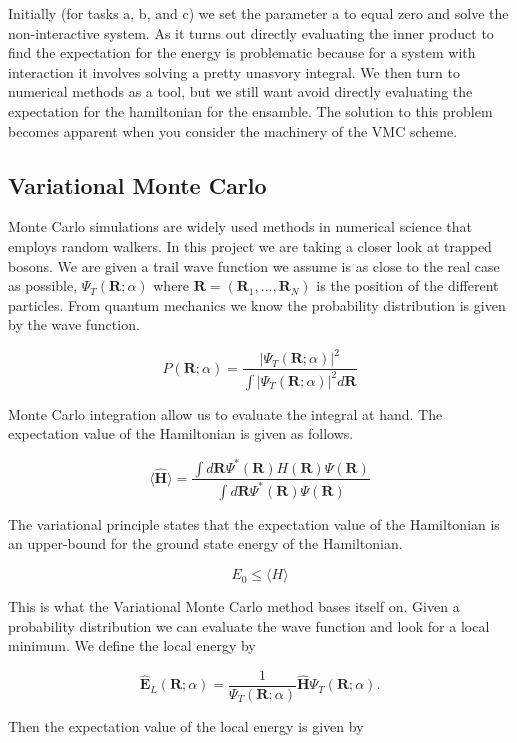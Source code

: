 \noindent Initially (for tasks a, b, and c) we set the parameter a to equal zero and solve the non-interactive system. As it turns out directly evaluating the inner product to find the expectation for the energy is problematic because for a system with interaction it involves solving a pretty unasvory integral. We then turn to numerical methods as a tool, but we still want avoid directly evaluating the expectation for the hamiltonian for the ensamble. The solution to this problem becomes apparent when you consider the machinery of the VMC scheme.

\subsection{Variational Monte Carlo}

Monte Carlo simulations are widely used methods in numerical science that employs random walkers. 
In this project we are taking a closer look at trapped bosons. We are given a trail wave function we assume is as close to the real case as possible, $\Psi_T(\mathbf{R};\alpha)$ where $\mathbf{R} = (\mathbf{R}_1, ... , \mathbf{R}_N)$ is the position of the different particles. 
From quantum mechanics we know the probability distribution is given by the wave function. 

$$P(\mathbf{R}; \alpha) = \frac{|\Psi_T(\mathbf{R};\alpha)|^2}{\int |\Psi_T(\mathbf{R};\alpha)|^2 d\mathbf{R}}$$

Monte Carlo integration allow us to evaluate the integral at hand. The expectation value of the Hamiltonian is given as follows. 

$$\langle \widehat{\mathbf{H}}\rangle = \frac{\int d \mathbf{R} \Psi^{\ast} (\mathbf{R})H(\mathbf{R}) \Psi(\mathbf{R})}{\int d \mathbf{R} \Psi^{\ast} (\mathbf{R}) \Psi(\mathbf{R})}$$

The variational principle states that the expectation value of the Hamiltonian is an upper-bound for the ground state energy of the Hamiltonian.

$$E_0 \leq \langle H \rangle$$

This is what the Variational Monte Carlo method bases itself on. Given a probability distribution we can evaluate the wave function and look for a local minimum. We define the local energy by

$$\widehat{\mathbf{E}}_L(\mathbf{R};\alpha) = \frac{1}{\Psi_T(\mathbf{R};\alpha)}\widehat{\mathbf{H}}\Psi_T(\mathbf{R};\alpha).$$

Then the expectation value of the local energy is given by


